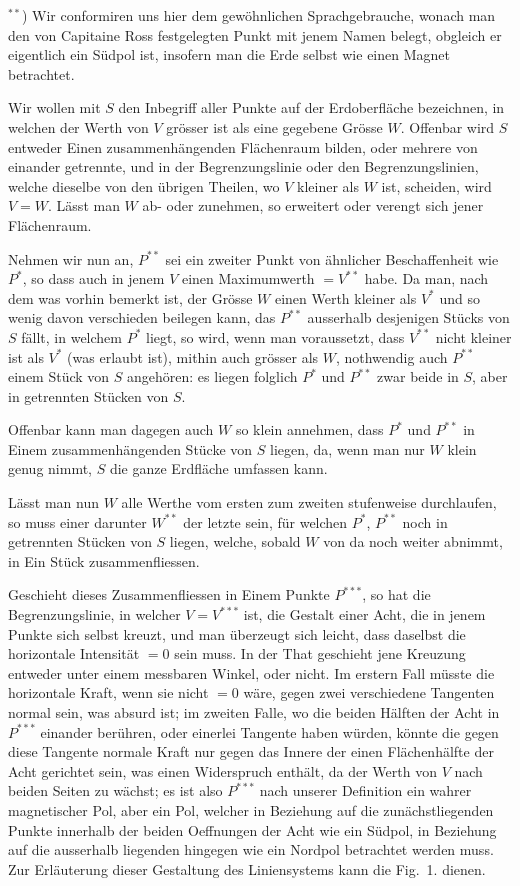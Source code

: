 \documentclass[fontsize=11pt,paper=a4,twoside,openany]{scrbook}
\begin{document}
$^{**}$) Wir conformiren uns hier dem gewöhnlichen Sprachgebrauche, wonach man den von Capitaine Ross festgelegten Punkt mit jenem Namen belegt, obgleich er eigentlich ein Südpol ist, insofern man die Erde selbst wie einen Magnet betrachtet.

Wir wollen mit $S$ den Inbegriff aller Punkte auf der Erdoberfläche bezeichnen, in welchen der Werth von $V$ grösser ist als eine gegebene Grösse $W$. Offenbar wird $S$ entweder Einen zusammenhängenden Flächenraum bilden, oder mehrere von einander getrennte, und in der Begrenzungslinie oder den Begrenzungslinien, welche dieselbe von den übrigen Theilen, wo $V$ kleiner als $W$ ist, scheiden, wird $V=W$. Lässt man $W$ ab- oder zunehmen, so erweitert oder verengt sich jener Flächenraum.

Nehmen wir nun an, $P^{**}$ sei ein zweiter Punkt von ähnlicher Beschaffenheit wie $P^{*}$, so dass auch in jenem $V$ einen Maximumwerth $=V^{**}$ habe. Da man, nach dem was vorhin bemerkt ist, der Grösse $W$ einen Werth kleiner als $V^{*}$ und so wenig davon verschieden beilegen kann, das $P^{**}$ ausserhalb desjenigen Stücks von $S$ fällt, in welchem $P^{*}$ liegt, so wird, wenn man voraussetzt, dass $V^{**}$ nicht kleiner ist als $V^{*}$ (was erlaubt ist), mithin auch grösser als $W$, nothwendig auch $P^{**}$ einem Stück von $S$ angehören: es liegen folglich $P^{*}$ und $P^{**}$ zwar beide in $S$, aber in getrennten Stücken von $S$.

Offenbar kann man dagegen auch $W$ so klein annehmen, dass $P^{*}$ und $P^{**}$ in Einem zusammenhängenden Stücke von $S$ liegen, da, wenn man nur $W$ klein genug nimmt, $S$ die ganze Erdfläche umfassen kann.

Lässt man nun $W$ alle Werthe vom ersten zum zweiten stufenweise durchlaufen, so muss einer darunter $W^{**}$ der letzte sein, für welchen $P^{*}$, $P^{**}$ noch in getrennten Stücken von $S$ liegen, welche, sobald $W$ von da noch weiter abnimmt, in Ein Stück zusammenfliessen.

Geschieht dieses Zusammenfliessen in Einem Punkte $P^{***}$, so hat die Begrenzungslinie, in welcher $V=V^{***}$ ist, die Gestalt einer Acht, die in jenem Punkte sich selbst kreuzt, und man überzeugt sich leicht, dass daselbst die horizontale Intensität $=0$ sein muss. In der That geschieht jene Kreuzung entweder unter einem messbaren Winkel, oder nicht. Im erstern Fall müsste die horizontale Kraft, wenn sie nicht $=0$ wäre, gegen zwei verschiedene Tangenten normal sein, was absurd ist; im zweiten Falle, wo die beiden Hälften der Acht in $P^{***}$ einander berühren, oder einerlei Tangente haben würden, könnte die gegen diese Tangente normale Kraft nur gegen das Innere der einen Flächenhälfte der Acht gerichtet sein, was einen Widerspruch enthält, da der Werth von $V$ nach beiden Seiten zu wächst; es ist also $P^{***}$ nach unserer Definition ein wahrer magnetischer Pol, aber ein Pol, welcher in Beziehung auf die zunächstliegenden Punkte innerhalb der beiden Oeffnungen der Acht wie ein Südpol, in Beziehung auf die ausserhalb liegenden hingegen wie ein Nordpol betrachtet werden muss. Zur Erläuterung dieser Gestaltung des Liniensystems kann die Fig.~1. dienen.
\end{document}
